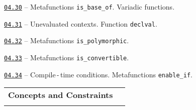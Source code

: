 \documentclass[a4paper,12pt]{article}
\renewenvironment{itemize}
{
    \begin{list}{\labelitemi}
    {
      \setlength{\topsep}{0pt}
      \setlength{\partopsep}{0pt}
      \setlength{\parskip}{0pt}
      \setlength{\itemsep}{0pt}
      \setlength{\parsep}{0pt}
      \setlength{\leftmargin}{14.5pt}
    }
}{\end{list}}
\begin{document}
\begin{itemize}
    \smallskip

    \item \href{https://github.com/i-s-m-mipt/Education/blob/master/projects/examples/source/04.30.cpp}{\texttt{04.30}} -- Metafunctions \lstinline{is_base_of}. Variadic functions.

    \smallskip

    \item \href{https://github.com/i-s-m-mipt/Education/blob/master/projects/examples/source/04.31.cpp}{\texttt{04.31}} -- Unevaluated contexts. Function \lstinline{declval}.

    \smallskip

    \item \href{https://github.com/i-s-m-mipt/Education/blob/master/projects/examples/source/04.32.cpp}{\texttt{04.32}} -- Metafunctions \lstinline{is_polymorphic}.

    \smallskip

    \item \href{https://github.com/i-s-m-mipt/Education/blob/master/projects/examples/source/04.33.cpp}{\texttt{04.33}} -- Metafunctions \lstinline{is_convertible}.

    \smallskip

    \item \href{https://github.com/i-s-m-mipt/Education/blob/master/projects/examples/source/04.34.cpp}{\texttt{04.34}} -- Compile\,-\,time conditions. Metafunctions \lstinline{enable_if}.

\end{itemize}

\bigskip\medskip

\begin{tabular}{!{\vrule width 1pt}L{5.1cm}!{\vrule width 1pt}L{13.9cm}!{\vrule width 0pt}} 


\textbf{Concepts and Constraints} & \\


\end{tabular}

\medskip\smallskip
\end{document}
